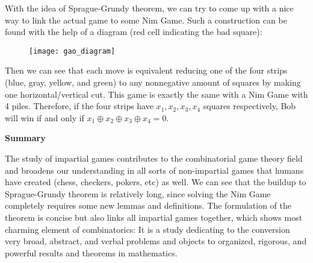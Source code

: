 		\begin{solution}
			With the idea of Sprague-Grundy theorem, we can try to come up with a nice way to link the actual game to some Nim Game. Such a construction can be found with the help of a diagram (red cell indicating the bad square):\\

\begin{figure}[h]
  \begin{center}
    \texttt{[image: gao\_diagram]}
  \end{center}
\end{figure}

			\indent Then we can see that each move is equivalent reducing one of the four strips (blue, gray, yellow, and green) to any nonnegative amount of squares by making one horizontal/vertical cut. This game is exactly the same with a Nim Game with 4 piles. Therefore, if the four strips have $x_1,x_2,x_3,x_4$ squares respectively, Bob will win if and only if $x_1 \oplus x_2 \oplus x_3 \oplus x_4 = 0$.
		\end{solution}
		\noindent
	\textbf{Summary}
	
		The study of impartial games contributes to the combinatorial game theory field and broadens our understanding in all sorts of non-impartial games that humans have created (chess, checkers, pokers, etc) as well. We can see that the buildup to Sprague-Grundy theorem is relatively long, since solving the Nim Game completely requires some new lemmas and definitions. The formulation of the theorem is concise but also links all impartial games together, which shows most charming element of combinatorics: It is a study dedicating to the conversion very broad, abstract, and verbal problems and objects to organized, rigorous, and powerful results and theorems in mathematics.